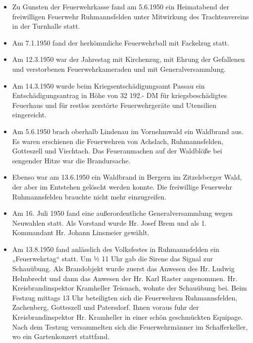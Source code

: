 \documentclass[12pt,a4paper]{book}
\begin{document}
\begin{itemize}
\item Zu Gunsten der Feuerwehrkasse fand am 5.6.1950 ein Heimatabend der
freiwilligen Feuerwehr Ruhmannsfelden unter Mitwirkung des Trachtenvereins in
der Turnhalle statt.

\item Am 7.1.1950 fand der herkömmliche Feuerwehrball mit Fackelzug statt.

\item Am 12.3.1950 war der Jahrestag mit Kirchenzug, mit Ehrung der Gefallenen
und verstorbenen Feuerwehrkameraden und mit Generalversammlung.

\item Am 14.3.1950 wurde beim Kriegsentschädigungsamt Passau ein
Entschädigungsantrag in Höhe von 32 192.- DM für kriegsbeschädigtes Feuerhaus
und für restlos zerstörte Feuerwehrgeräte und Utensilien eingereicht.

\item Am 5.6.1950 brach oberhalb Lindenau im Vornehmwald ein Waldbrand aus. Es
waren erschienen die Feuerwehren von Achslach, Ruhmannsfelden, Gotteszell und
Viechtach. Das Feueranmachen auf der Waldblöße bei sengender Hitze war die
Brandursache.

\item Ebenso war am 13.6.1950 ein Waldbrand in Bergern im Zitzelsberger Wald,
der aber im Entstehen gelöscht werden konnte. Die freiwillige Feuerwehr
Ruhmannsfelden brauchte nicht mehr einzugreifen.

\item Am 16. Juli 1950 fand eine außerordentliche Generalversammlung wegen
Neuwahlen statt. Als Vorstand wurde Hr. Josef Brem und als 1. Kommandant Hr.
Johann Linsmeier gewählt.

\item Am 13.8.1950 fand anlässlich des Volksfestes in Ruhmannsfelden ein
„Feuerwehrtag“ statt. Um ½ 11 Uhr gab die Sirene das Signal zur Schauübung. Als
Brandobjekt wurde zuerst das Anwesen des Hr. Ludwig Helmbrecht und dann das
Anwesen der Hr. Karl Raster angenommen. Hr. Kreisbrandinspektor Kramheller
Teisnach, wohnte der Schauübung bei. Beim Festzug mittags 13 Uhr beteiligten
sich die Feuerwehren Ruhmannsfelden, Zachenberg, Gotteszell und Patersdorf.
Ihnen voraus fuhr der Kreisbrandinspektor Hr. Kramheller in einer schön
geschmückten Equipage. Nach dem Testzug versammelten sich die Feuerwehrmänner im
Schafferkeller, wo ein Gartenkonzert stattfand.


\end{itemize}
\end{document}
